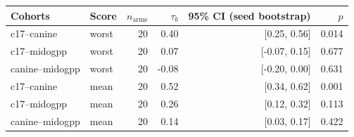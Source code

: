 \begin{tabular}{llrrrr}
\toprule
Cohorts & Score & $n_\text{arms}$ & $\tau_b$ & 95\% CI (seed bootstrap) & $p$ \\
\midrule
c17--canine & worst & 20 & 0.40 & [0.25, 0.56] & 0.014 \\
c17--midogpp & worst & 20 & 0.07 & [-0.07, 0.15] & 0.677 \\
canine--midogpp & worst & 20 & -0.08 & [-0.20, 0.00] & 0.631 \\
c17--canine & mean & 20 & 0.52 & [0.34, 0.62] & 0.001 \\
c17--midogpp & mean & 20 & 0.26 & [0.12, 0.32] & 0.113 \\
canine--midogpp & mean & 20 & 0.14 & [0.03, 0.17] & 0.422 \\
\bottomrule
\end{tabular}
